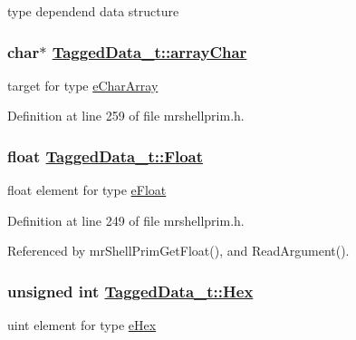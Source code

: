 type dependend data structure 

\hypertarget{structTaggedData__t_e7f993fc307df08808cd7aff4962f656}{
\subsubsection[arrayChar]{\setlength{\rightskip}{0pt plus 5cm}char$\ast$ \hyperlink{structTaggedData__t_e7f993fc307df08808cd7aff4962f656}{Tagged\-Data\_\-t::array\-Char}}}
\label{structTaggedData__t_e7f993fc307df08808cd7aff4962f656}


target for type \hyperlink{mrshellprim_8h_76a810650461f2062938ee9b82666b360a10a6c7f681516162b85d6096fc394e}{e\-Char\-Array} 



Definition at line 259 of file mrshellprim.h.\hypertarget{structTaggedData__t_a7851afd8e427802c7fa7a2d7b9651dd}{
\subsubsection[Float]{\setlength{\rightskip}{0pt plus 5cm}float \hyperlink{structTaggedData__t_a7851afd8e427802c7fa7a2d7b9651dd}{Tagged\-Data\_\-t::Float}}}
\label{structTaggedData__t_a7851afd8e427802c7fa7a2d7b9651dd}


float element for type \hyperlink{mrshellprim_8h_76a810650461f2062938ee9b82666b364a5cba5eee27b47a9cf3714e4db4206d}{e\-Float} 



Definition at line 249 of file mrshellprim.h.

Referenced by mr\-Shell\-Prim\-Get\-Float(), and Read\-Argument().\hypertarget{structTaggedData__t_fb6384a765e6dec1e70a7044d44cfbb5}{
\subsubsection[Hex]{\setlength{\rightskip}{0pt plus 5cm}unsigned int \hyperlink{structTaggedData__t_fb6384a765e6dec1e70a7044d44cfbb5}{Tagged\-Data\_\-t::Hex}}}
\label{structTaggedData__t_fb6384a765e6dec1e70a7044d44cfbb5}


uint element for type \hyperlink{mrshellprim_8h_76a810650461f2062938ee9b82666b36a64d04be3dc94180a329fac904a5d239}{e\-Hex} 



